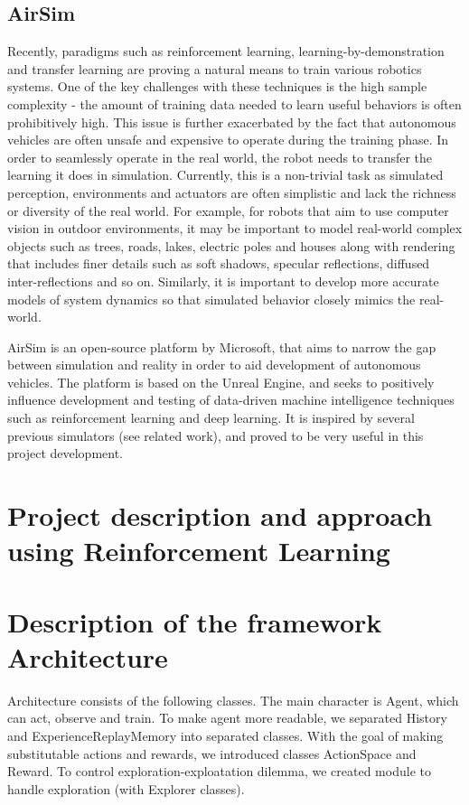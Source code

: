 \documentclass{article}
\begin{document}
\subsection{AirSim}

Recently, paradigms such as reinforcement learning, learning-by-demonstration
and transfer learning are proving a natural means to train various robotics
systems. One of the key challenges with these techniques is the high sample 
complexity - the amount of training data needed to learn useful behaviors is often 
prohibitively high. This issue is further exacerbated by the fact that autonomous 
vehicles are often unsafe and expensive to operate during the training phase. In order to
seamlessly operate in the real world, the robot needs to transfer the learning it does
in simulation. Currently, this is a non-trivial task as simulated perception, environments 
and actuators are often simplistic and lack the richness or diversity of the
real world. For example, for robots that aim to use computer vision in outdoor 
environments, it may be important to model real-world complex objects such as trees,
roads, lakes, electric poles and houses along with rendering that includes finer 
details such as soft shadows, specular reflections, diffused inter-reflections and so on.
Similarly, it is important to develop more accurate models of system dynamics so
that simulated behavior closely mimics the real-world.

AirSim  is  an  open-source  platform \cite{airsim2017fsr} by Microsoft, 
that  aims  to  narrow  the  gap  between
simulation  and  reality  in  order  to  aid  development  of  autonomous  vehicles.  
The platform is based on the Unreal Engine, and seeks to positively 
influence development and testing of data-driven
machine intelligence techniques such as reinforcement learning and 
deep learning. It is inspired by several previous simulators (see 
related work), and proved to be very useful in this project development.

\section{Project description and approach using Reinforcement Learning}

\section{Description of the framework Architecture}

Architecture consists of the following classes. The main character is Agent, which can act, observe and train.
To make agent more readable, we separated History and ExperienceReplayMemory into separated classes.
With the goal of making substitutable actions and rewards, we introduced classes ActionSpace and Reward.
To control exploration-exploatation dilemma, we created module to handle exploration (with Explorer classes).
\end{document}
